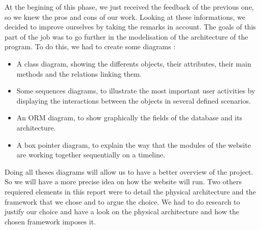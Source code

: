 At the begining of this phase, we just received the feedback of the previous one, so we knew the pros and cons of our work.
Looking at these informations, we decided to improve ourselves by taking the remarks in account.
The goals of this part of the job was to go further in the modelisation of the architecture of the program.
To do this, we had to create some diagrams : 
\begin{itemize}
\item A class diagram, showing the differents objects, their attributes, their main methods and the relations linking them.
\item Some sequences diagrams, to illustrate the most important user activities by displaying the interactions between the objects in several defined scenarios.
\item An ORM diagram, to show graphically the fields of the database and its architecture.
\item A box pointer diagram, to explain the way that the modules of the website are working together sequentially on a timeline.
\end{itemize}
Doing all theses diagrams will allow us to have a better overview of the project. So we will have a more precise idea on how the website will run. 
Two others requiered elements in this report were to detail the physical architecture and the framework that we chose and to argue the choice.
We had to do research to justify our choice and have a look on the physical architecture and how the chosen framework imposes it.